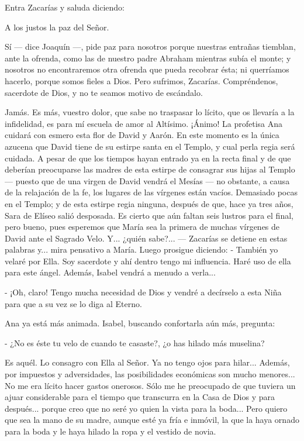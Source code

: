 \documentclass[12pt]{book} %
\begin{document}
Entra Zacarías y saluda diciendo: 

A los justos la paz del Señor. 

Sí — dice Joaquín —, pide paz para nosotros porque nuestras entrañas tiemblan, ante la ofrenda, como las de nuestro padre Abraham mientras subía el monte; y nosotros no encontraremos otra ofrenda que pueda recobrar ésta; ni querríamos hacerlo, porque somos fieles a Dios. Pero sufrimos, Zacarías. Compréndenos, sacerdote de Dios, y no te seamos motivo de escándalo. 

Jamás. Es más, vuestro dolor, que sabe no traspasar lo lícito, que os llevaría a la infidelidad, es para mí escuela de amor al Altísimo. ¡Ánimo! La profetisa Ana cuidará con esmero esta flor de David y Aarón. En este momento es la única azucena que David tiene de su estirpe santa en el Templo, y cual perla regia será cuidada. A pesar de que los tiempos hayan entrado ya en la recta final y de que deberían preocuparse las madres de esta estirpe de consagrar sus hijas al Templo — puesto que de una virgen de David vendrá el Mesías — no obstante, a causa de la relajación de la fe, los lugares de las vírgenes están vacíos. Demasiado pocas en el Templo; y de esta estirpe regia ninguna, después de que, hace ya tres años, Sara de Elíseo salió desposada. Es cierto que aún faltan seis lustros para el final, pero bueno, pues esperemos que María sea la primera de muchas vírgenes de David ante el Sagrado Velo. Y... ¿quién sabe?... — Zacarías se detiene en estas palabras y... mira pensativo a María. Luego prosigue diciendo: - También yo velaré por Ella. Soy sacerdote y ahí dentro tengo mi influencia. Haré uso de ella para este ángel. Además, Isabel vendrá a menudo a verla... 

- ¡Oh, claro! Tengo mucha necesidad de Dios y vendré a decírselo a esta Niña para que a su vez se lo diga al Eterno. 

Ana ya está más animada. Isabel, buscando confortarla aún más, pregunta: 

- ¿No es éste tu velo de cuando te casaste?, ¿o has hilado más muselina? 

Es aquél. Lo consagro con Ella al Señor. Ya no tengo ojos para hilar... Además, por impuestos y adversidades, las posibilidades económicas son mucho menores... No me era lícito hacer gastos onerosos. Sólo me he preocupado de que tuviera un ajuar considerable para el tiempo que transcurra en la Casa de Dios y para después... porque creo que no seré yo quien la vista para la boda... Pero quiero que sea la mano de su madre, aunque esté ya fría e inmóvil, la que la haya ornado para la boda y le haya hilado la ropa y el vestido de novia. 
\end{document}

